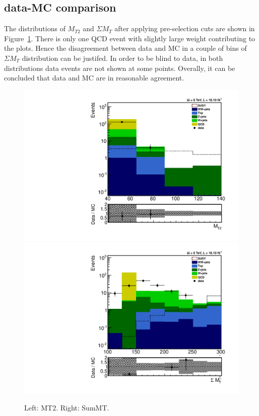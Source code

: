 \subsection{data-MC comparison}
The distributions of $M_{T2}$ and $\Sigma M_T$ after applying pre-selection cuts are shown in Figure~\ref{fig:comparison}. There is only one QCD event with slightly large weight contributing to the plots. Hence the disagreement between data and MC in a couple of bins of $\Sigma M_T$ distribution can be justifed. In order to be blind to data, in both distributions data events are not shown at some points. Overally, it can be concluded that data and MC are in reasonable agreement. 
\begin{figure}[htbp]
\centering
\includegraphics[angle=0,scale=0.35]{TauTauFigs/MT2_4bins.pdf}
\includegraphics[angle=0,scale=0.35]{TauTauFigs/SumMT_8bins.pdf} \\
\caption{Left: MT2. Right: SumMT.}
\label{fig:comparison}
\end{figure}
